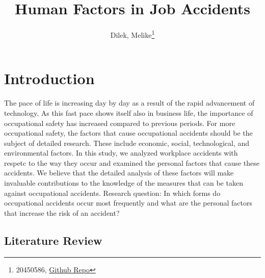\documentclass[
  12pt,
]{article}
\title{Human Factors in Job Accidents}
\author{Dilek, Melike\footnote{20450586, \href{https://github.com/MelikeDilek/Midterm.git/MelikeDilek/Midterm}{Github Repo}}}
\date{}
\begin{document}
\maketitle

\hypertarget{introduction}{%
\section{Introduction}\label{introduction}}

The pace of life is increasing day by day as a result of the rapid advancement of technology. As this fast pace shows itself also in business life, the importance of occupational safety has increased compared to previous periods. For more occupational safety, the factors that cause occupational accidents should be the subject of detailed research. These include economic, social, technological, and environmental factors. In this study, we analyzed workplace accidents with respetc to the way they occur and examined the personal factors that cause these accidents. We believe that the detailed analysis of these factors will make invaluable contributions to the knowledge of the measures that can be taken against occupational accidents. Research question: In which forms do occupational accidents occur most frequently and what are the personal factors that increase the risk of an accident?

\hypertarget{literature-review}{%
\subsection{Literature Review}\label{literature-review}}
\end{document}

